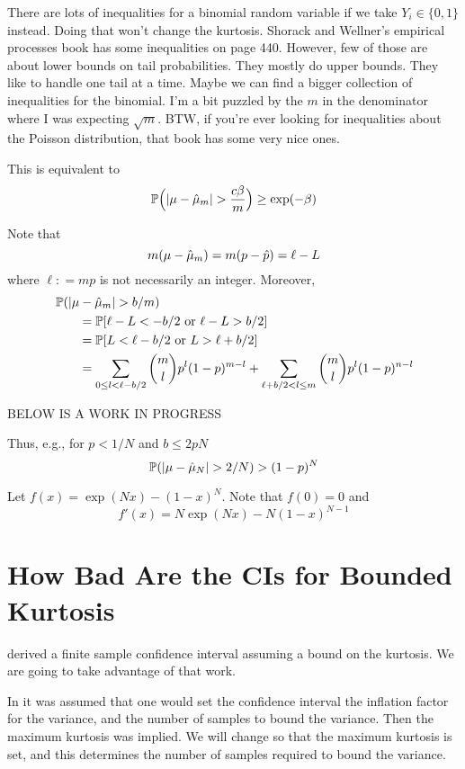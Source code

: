 \documentclass{amsart}
\newcommand{\art}[1]{{\color{blue}#1}}
\begin{document}
\art{There are lots of inequalities for a binomial random variable if we take $Y_i\in\{0,1\}$ instead. Doing that won't change the kurtosis. Shorack and Wellner's empirical processes book has some inequalities on page 440. However, few of those are about lower bounds on tail probabilities. They mostly do upper bounds. They like to handle one tail at a time.  Maybe we can find a bigger collection of inequalities for the binomial.  I'm a bit puzzled by the $m$ in the denominator where I was expecting $\sqrt{m}$. BTW, if you're ever looking for inequalities about the Poisson distribution, that book has some very nice ones. }

This is equivalent to
\[
\operatorname{\mathbb{P}}\Bigl(\lvert \mu - \hat{\mu}_m \rvert > \frac{c \beta}{m} \Bigr) \ge \exp(-\beta)
\]

Note that 
\[
m(\mu - \hat{\mu}_m)  = m(p - \hat{p}) = \ell - L
\]
where $\ell : = mp$ is not necessarily an integer.
Moreover, 
\begin{align*}
    \MoveEqLeft \Prob(\lvert \mu - \hmu_m \rvert > b/m) \\
    &= \Prob[ \ell - L < -b/2 \text{ or } \ell - L >  b/2] \\
    &= \Prob[ L < \ell - b/2 \text{ or } L > \ell + b/2] \\
    & = \sum_{0 \le l  < \ell - b/2}  \binom{m}{l} p^{l}(1-p)^{m-l} 
    + \sum_{\ell + b/2 < l \le m}  \binom{m}{l} p^l(1-p)^{n-l}
\end{align*}

\bigskip

BELOW IS A WORK IN PROGRESS


Thus, e.g., for $p < 1/N$ and $b \le 2pN $
\[
\operatorname{\mathbb{P}}(\lvert \mu - \hat{\mu}_N \rvert > 2/N) 
> (1-p)^{N} 
\]

Let $f(x) = \exp(Nx) - (1-x)^N$.  Note that $f(0) =0$ and 
\[
f'(x) = N \exp(Nx) - N(1-x)^{N-1}
\]

\section{How Bad Are the CIs for Bounded Kurtosis}

\cite{HicEtal14a} derived a finite sample confidence interval assuming a bound on the kurtosis.  We are going to take advantage of that work.

In \cite{HicEtal14a} it was assumed that one would set the confidence interval the inflation factor for the variance, and the number of samples to bound the variance.  Then the maximum kurtosis was implied.  We will change so that the maximum kurtosis is set, and this determines the number of samples required to bound the variance.
\end{document}
